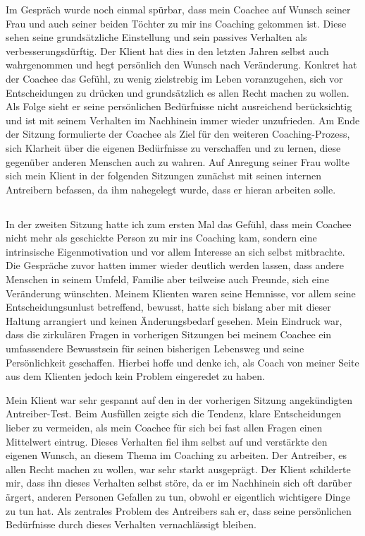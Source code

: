 \documentclass[11pt,a4paper]{article}
\begin{document}
Im Gespräch wurde noch einmal spürbar, dass mein Coachee auf Wunsch seiner Frau und auch seiner beiden Töchter zu mir ins Coaching gekommen ist. Diese sehen seine grundsätzliche Einstellung und sein passives Verhalten als verbesserungsdürftig. Der Klient hat dies in den letzten Jahren selbst auch wahrgenommen und hegt persönlich den Wunsch nach Veränderung. Konkret hat der Coachee das Gefühl, zu wenig zielstrebig im Leben voranzugehen, sich vor Entscheidungen zu drücken und grundsätzlich es allen Recht machen zu wollen. Als Folge sieht er seine persönlichen Bedürfnisse nicht ausreichend berücksichtig und ist mit seinem Verhalten im Nachhinein immer wieder unzufrieden. Am Ende der Sitzung formulierte der Coachee als Ziel für den weiteren Coaching-Prozess, sich Klarheit über die eigenen Bedürfnisse zu verschaffen und zu lernen, diese gegenüber anderen Menschen auch zu wahren. Auf Anregung seiner Frau wollte sich mein Klient in der folgenden Sitzungen zunächst mit seinen internen Antreibern befassen, da ihm nahegelegt wurde, dass er hieran arbeiten solle.



\subsection*{\color{Orange}{Zweite Sitzung: Antreiber-Modell}}

In der zweiten Sitzung hatte ich zum ersten Mal das Gefühl, dass mein Coachee nicht mehr als geschickte Person zu mir ins Coaching kam, sondern eine intrinsische Eigenmotivation und vor allem Interesse an sich selbst mitbrachte. Die Gespräche zuvor hatten immer wieder deutlich werden lassen, dass andere Menschen in seinem Umfeld, Familie aber teilweise auch Freunde, sich eine Veränderung wünschten. Meinem Klienten waren seine Hemnisse, vor allem seine Entscheidungsunlust betreffend, bewusst, hatte sich bislang aber mit dieser Haltung arrangiert und keinen Änderungsbedarf gesehen. Mein Eindruck war, dass die zirkulären Fragen in vorherigen Sitzungen bei meinem Coachee ein umfassendere Bewusstsein für seinen bisherigen Lebensweg und seine Persönlichkeit geschaffen. Hierbei hoffe und denke ich, als Coach von meiner Seite aus dem Klienten jedoch kein Problem eingeredet zu haben. 

Mein Klient war sehr gespannt auf den in der vorherigen Sitzung angekündigten Antreiber-Test. Beim Ausfüllen zeigte sich die Tendenz, klare Entscheidungen lieber zu vermeiden, als mein Coachee für sich bei fast allen Fragen einen Mittelwert eintrug. Dieses Verhalten fiel ihm selbst auf und verstärkte den eigenen Wunsch, an diesem Thema im Coaching zu arbeiten. Der Antreiber, es allen Recht machen zu wollen, war sehr starkt ausgeprägt. Der Klient schilderte mir, dass ihn dieses Verhalten selbst störe, da er im Nachhinein sich oft darüber ärgert, anderen Personen Gefallen zu tun, obwohl er eigentlich wichtigere Dinge zu tun hat. Als zentrales Problem des Antreibers sah er, dass seine persönlichen Bedürfnisse durch dieses Verhalten vernachlässigt bleiben.
\end{document}
